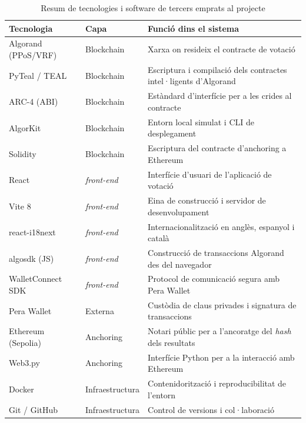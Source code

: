 \begin{table}[H]
\centering
\small
\begin{tabularx}{\textwidth}{l l X}
\toprule
\textbf{Tecnologia} & \textbf{Capa} & \textbf{Funció dins el sistema} \\
\midrule
Algorand (PPoS/VRF) & Blockchain & Xarxa on resideix el contracte de votació \\
PyTeal / TEAL & Blockchain & Escriptura i compilació dels contractes intel·ligents d'Algorand \\
ARC-4 (ABI) & Blockchain & Estàndard d'interfície per a les crides al contracte \\
AlgorKit & Blockchain & Entorn local simulat i CLI de desplegament \\
Solidity & Blockchain & Escriptura del contracte d'anchoring a Ethereum \\
React & \textit{front-end} & Interfície d'usuari de l'aplicació de votació \\
Vite 8 & \textit{front-end} & Eina de construcció i servidor de desenvolupament \\
react-i18next & \textit{front-end} & Internacionalització en anglès, espanyol i català \\
algosdk (JS) & \textit{front-end} & Construcció de transaccions Algorand des del navegador \\
WalletConnect SDK & \textit{front-end} & Protocol de comunicació segura amb Pera Wallet \\
Pera Wallet & Externa & Custòdia de claus privades i signatura de transaccions \\
Ethereum (Sepolia) & Anchoring & Notari públic per a l'ancoratge del \textit{hash} dels resultats \\
Web3.py & Anchoring & Interfície Python per a la interacció amb Ethereum \\
Docker & Infraestructura & Contenidorització i reproducibilitat de l'entorn \\
Git / GitHub & Infraestructura & Control de versions i col·laboració \\
\bottomrule
\end{tabularx}
\caption{Resum de tecnologies i software de tercers emprats al projecte}
\label{tab:tecnologies}
\end{table}
 
 
